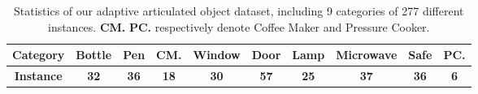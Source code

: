 \begin{table}
  \vspace{-0.2cm}
  \caption{Statistics of our adaptive articulated object dataset, including 9 categories of 277 different instances. \textbf{CM.} \textbf{PC.} respectively denote Coffee Maker and Pressure Cooker.}
  \label{tab:datasets}
  \centering
  \begin{tabular}{cccccccccc}
    \toprule
    \textbf{Category} & \textbf{Bottle} & \textbf{Pen} &
    \textbf{CM.} & \textbf{Window} & \textbf{Door} &
    \textbf{Lamp} & \textbf{Microwave} & \textbf{Safe} &
    \textbf{PC.}\\
    \toprule
    \textbf{Instance} &\textbf{32}  & \textbf{36}  & \textbf{18}  & \textbf{30}  & \textbf{57}  & \textbf{25} & \textbf{37} & \textbf{36}& \textbf{6}\\
    \bottomrule
  \end{tabular}
  \vspace{-0.2cm}
\end{table}